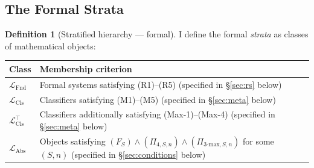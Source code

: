 \documentclass[11pt]{article}
\theoremstyle{plain}
\theoremstyle{definition}
\newtheorem{definition}[theorem]{Definition}
\newcommand{\LFnd}{\mathcal{L}_{\mathrm{Fnd}}}
\newcommand{\LCls}{\mathcal{L}_{\mathrm{Cls}}}
\newcommand{\LClsMax}{\mathcal{L}_{\mathrm{Cls}}^{\top}}
\newcommand{\LAbs}{\mathcal{L}_{\mathrm{Abs}}}
\begin{document}
\subsection{The Formal Strata}

\begin{definition}[Stratified hierarchy --- formal]\label{def:hierarchy}
I define the formal \emph{strata} as classes of mathematical objects:

\begin{tabular}{@{}ll@{}}
\toprule
Class & Membership criterion \\ \midrule
$\LFnd$ & Formal systems satisfying (R1)--(R5) (specified in \S\ref{sec:rs} below) \\
$\LCls$ & Classifiers satisfying (M1)--(M5) (specified in \S\ref{sec:meta} below) \\
$\LClsMax$ & Classifiers additionally satisfying (Max-1)--(Max-4) (specified in \S\ref{sec:meta} below) \\
$\LAbs$ & Objects satisfying $(F_S) \wedge (\Pi_{4, S, n}) \wedge (\Pi_{3\text{-max}, S, n})$ for some $(S, n)$ (specified in \S\ref{sec:conditions} below) \\
\bottomrule
\end{tabular}
\end{definition}
\end{document}

